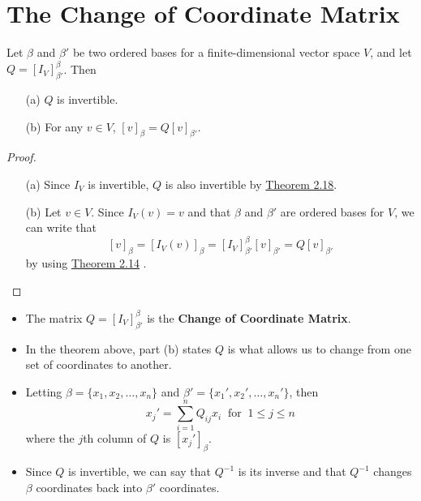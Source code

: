 \section{The Change of Coordinate Matrix}

\begin{theorem}
   Let \( \beta  \) and \( \beta'  \) be two ordered bases for a finite-dimensional vector space \( V  \), and let \( Q = [{I}_{V}]_{\beta'}^{\beta}  \). Then
   \begin{enumerate}
       \item[(a)] \( Q  \) is invertible.
        \item[(b)] For any \( v \in V  \), \( [v]_{\beta} = Q [v]_{\beta'} \).
   \end{enumerate}
\end{theorem}
\begin{proof}
\begin{enumerate}
    \item[(a)] Since \( {I}_{V}  \) is invertible, \( Q \) is also invertible by {\hyperref[Theorem 2.18]{Theorem 2.18}}. 
    \item[(b)] Let \( v \in V  \). Since \( {I}_{V}(v) = v  \) and that \( \beta  \) and \( \beta' \) are ordered bases for \( V  \), we can write that
        \[  [v]_{\beta} = [{I}_{V}(v)]_{\beta} = [{I}_{V}]_{\beta'}^{\beta} [v]_{\beta'} = Q [v]_{\beta'}    \]
        by using {\hyperref[Theorem 2.14]{Theorem 2.14}} .
\end{enumerate}
\end{proof}

\begin{itemize}
    \item The matrix \( Q = [{I}_{V}]_{\beta'}^{\beta}  \) is the \textbf{Change of Coordinate Matrix}. 
    \item In the theorem above, part (b) states \( Q  \) is what allows us to change from one set of coordinates to another.
    \item Letting \( \beta = \{ {x}_{1}, {x}_{2}, \dots, {x}_{n} \}  \) and \( \beta' = \{ {x}_{1}', {x}_{2}', \dots, {x}_{n}' \}  \), then
        \[  {x}_{j}' = \sum_{ i=1 }^{ n } {Q}_{ij} {x}_{i} \ \text{ for } \ 1 \leq j \leq n  \]
        where the \(j  \)th column of \( Q  \) is \(  [{x}_{j}']_{\beta}\).
    \item Since \( Q  \) is invertible, we can say that \( Q^{-1} \) is its inverse and that \( Q^{-1} \) changes \( \beta  \) coordinates back into \( \beta'  \) coordinates.
\end{itemize}

